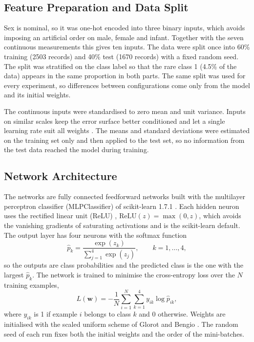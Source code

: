 \documentclass[conference]{IEEEtran}
\begin{document}
\subsection{Feature Preparation and Data Split}

Sex is nominal, so it was one-hot encoded into three binary inputs, which avoids imposing an artificial order on male, female and infant. Together with the seven continuous measurements this gives ten inputs. The data were split once into 60\% training (2503 records) and 40\% test (1670 records) with a fixed random seed. The split was stratified on the class label so that the rare class 1 (4.5\% of the data) appears in the same proportion in both parts. The same split was used for every experiment, so differences between configurations come only from the model and its initial weights.

The continuous inputs were standardised to zero mean and unit variance. Inputs on similar scales keep the error surface better conditioned and let a single learning rate suit all weights \cite{lecun1998}. The means and standard deviations were estimated on the training set only and then applied to the test set, so no information from the test data reached the model during training.

\subsection{Network Architecture}

The networks are fully connected feedforward networks built with the multilayer perceptron classifier (MLPClassifier) of scikit-learn 1.7.1 \cite{pedregosa2011}. Each hidden neuron uses the rectified linear unit (ReLU) \cite{nair2010}, $\mathrm{ReLU}(z) = \max(0, z)$, which avoids the vanishing gradients of saturating activations and is the scikit-learn default. The output layer has four neurons with the softmax function
\begin{equation}
\hat{p}_k = \frac{\exp(z_k)}{\sum_{j=1}^{4}\exp(z_j)}, \qquad k = 1,\dots,4,
\end{equation}
so the outputs are class probabilities and the predicted class is the one with the largest $\hat{p}_k$. The network is trained to minimise the cross-entropy loss over the $N$ training examples,
\begin{equation}
L(\mathbf{w}) = -\frac{1}{N}\sum_{i=1}^{N}\sum_{k=1}^{4} y_{ik}\log \hat{p}_{ik},
\end{equation}
where $y_{ik}$ is 1 if example $i$ belongs to class $k$ and 0 otherwise. Weights are initialised with the scaled uniform scheme of Glorot and Bengio \cite{glorot2010}. The random seed of each run fixes both the initial weights and the order of the mini-batches.
\end{document}
